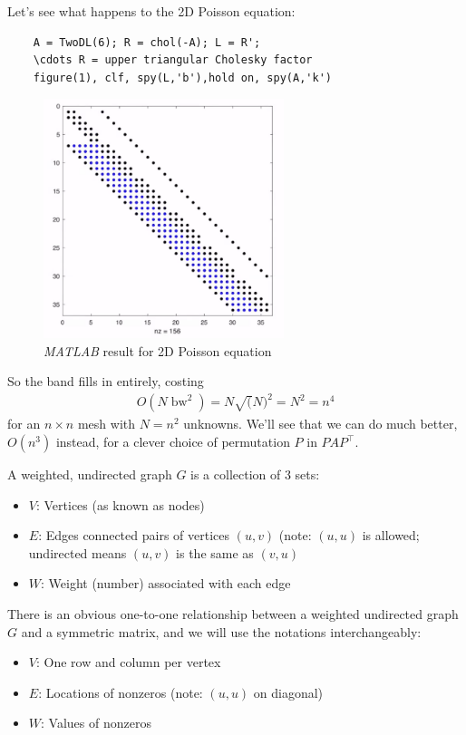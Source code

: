 \documentclass[11pt]{article}
\numberwithin{equation}{section}
\begin{document}
Let's see what happens to the 2D Poisson equation:
\begin{verbatim}
    A = TwoDL(6); R = chol(-A); L = R'; 
    \cdots R = upper triangular Cholesky factor
    figure(1), clf, spy(L,'b'),hold on, spy(A,'k')
\end{verbatim}

\begin{figure}[h]
    \centering
    \includegraphics[width = 7cm]{images/lec6-6.png}
    \caption{\textit{MATLAB} result for 2D Poisson equation}
\end{figure}

So the band fills in entirely, costing \begin{align*}
    O(N \operatorname{bw}^2) = N\sqrt(N)^2 = N^2 = n^4
\end{align*}
for an $n\times n$ mesh with $N = n^2$ unknowns. We'll see that we can do much better, $O(n^3)$ instead, for a clever choice of permutation $P$ in $PAP^\top$.

\begin{definition}
    A weighted, undirected graph $G$ is a collection of 3 sets: \begin{itemize}
        \item $V$: Vertices (as known as nodes)
        \item $E$: Edges connected pairs of vertices $(u,v)$ (note: $(u,u)$ is allowed; undirected means $(u,v)$ is the same as $(v,u)$
        \item $W$: Weight (number) associated with each edge
    \end{itemize}
\end{definition}

There is an obvious one-to-one relationship between a weighted undirected graph $G$ and a symmetric matrix, and we will use the notations interchangeably: \begin{itemize}
    \item $V$: One row and column per vertex
    \item $E$: Locations of nonzeros (note: $(u,u)$ on diagonal)
    \item $W$: Values of nonzeros
\end{itemize}
\end{document}
